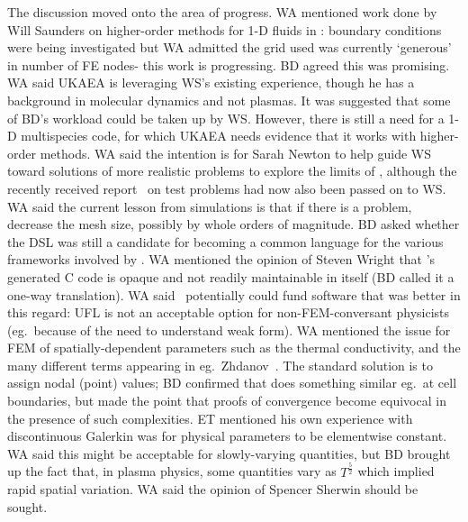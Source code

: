 The discussion moved onto the area of progress.  WA mentioned work done by Will 
Saunders on higher-order methods for 1-D fluids in : boundary 
conditions were being investigated but WA admitted the grid used was currently 
`generous' in number of FE nodes- this work is progressing.  BD agreed this was promising.  WA said 
UKAEA is leveraging WS's existing  experience, though he has a 
background in molecular dynamics and not plasmas.  It was suggested that some 
of BD's workload could be taken up by WS. However, there is still a need for a 
1-D multispecies code, for which UKAEA needs evidence that it works with 
higher-order methods.  WA said the intention is for Sarah Newton to help guide 
WS toward solutions of more realistic problems to explore the limits of ,
although the recently received report~\cite{2047356-TN-04} on test problems
had now also been passed on to WS.
WA said the current lesson from  simulations  is that if 
there is a problem, decrease the mesh size,
possibly by whole orders of magnitude.  BD asked whether the 
 DSL was still a candidate for becoming a common language for 
the various frameworks involved by \nep.  WA mentioned the opinion of Steven 
Wright that 's generated C code is opaque and not readily 
maintainable in itself (BD called it a one-way translation).  WA said \nep\ 
potentially could fund software that was better in this regard: UFL is not an 
acceptable option for non-FEM-conversant physicists (eg.\ because of the  need to understand 
weak form).  WA mentioned the issue for FEM of spatially-dependent parameters such as the
thermal conductivity, and the many different terms appearing in eg.\ Zhdanov~\cite{zhdanov}.
The standard solution is to assign nodal (point) values; BD confirmed that \F{BOUT++} 
does something similar eg.\ at cell boundaries, but made the point that proofs of 
convergence become equivocal in the presence of such complexities.  ET 
mentioned his own experience with discontinuous Galerkin was for physical 
parameters to be elementwise constant.  WA said this might be acceptable for 
slowly-varying quantities, but BD brought up the fact that, in plasma physics, 
some quantities vary as $T^{\frac{5}{2}}$ which implied rapid spatial 
variation.  WA said the opinion of Spencer Sherwin should be sought.

